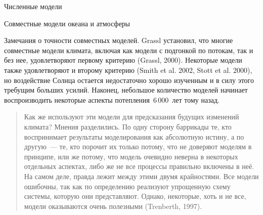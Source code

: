 \begin{chapter}{Численные модели}
\begin{section}{Совместные модели океана и атмосферы}
\begin{paragraph}{Замечания о точности совместных моделей.}
Grassl установил, что многие совместные модели климата, включая как модели
с подгонкой по потокам,
так и без нее, удовлетворяют первому критерию (Grassl, 2000). Некоторые
модели также удовлетворяют и второму критерию (Smith et al. 2002, Stott et al. 2000), 
но воздействие Солнца остается недостаточно хорошо изученным и в силу этого
требущим больших усилий. Наконец, небольшое количество моделей начинает
воспроизводить некоторые аспекты потепления~$6\,000$~лет тому назад. 
%
\begin{quote}
Как же используют эти модели для предсказания будущих изменений
климата? Мнения разделились. По одну сторону баррикады те, кто
воспринимает результаты моделирования как абсолютную истину, а по другую~---
те, кто порочит их только потому, что не доверяют моделям
в принципе, или же потому, что модель очевидно неверна в некоторых 
отдельных аспектах, либо же не все процессы правильно включены в неё. 
На самом деле, правда лежит между этими двумя крайностями. 
Все модели ошибочны, так как по определению реализуют упрощенную схему 
системы, которую они
представляют. Однако, некоторые, хоть и не все, модели оказываются очень 
полезными (Trenberth, 1997). 
%
\end{quote}
\end{paragraph}
\end{section}


\end{chapter}
